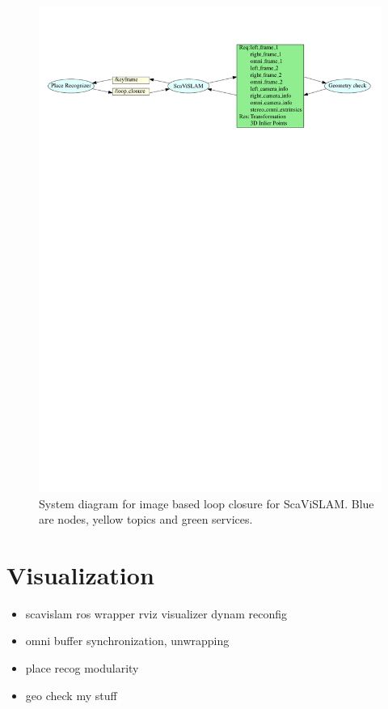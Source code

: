 \begin{figure}[H]
  \centering
    \includegraphics[width=1.1\textwidth]{chapters/images/loop_close_architecture}
  \caption{System diagram for image based loop closure for ScaViSLAM.  Blue are nodes, yellow topics and green services.}
  \label{fig:loop_close_architecture}
\end{figure}

\section{Visualization}


\begin{itemize}
 \item scavislam
 \subitem ros wrapper
 \subitem rviz visualizer
 \subitem dynam reconfig
 \item omni buffer
 \subitem synchronization, unwrapping
 \item place recog
 \subitem modularity
 \item geo check
 \subitem my stuff
\end{itemize}



